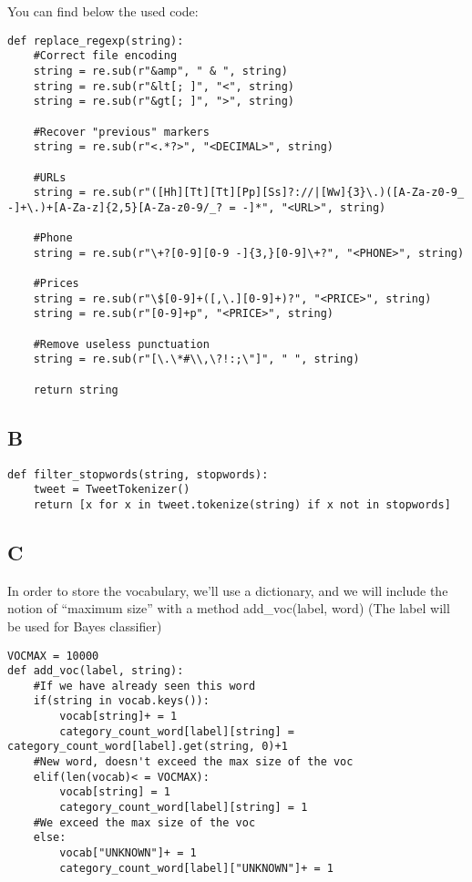 \documentclass{article}
\begin{document}
            You can find below the used code:
            \begin{verbatim}
def replace_regexp(string):
    #Correct file encoding
    string = re.sub(r"&amp", " & ", string)
    string = re.sub(r"&lt[; ]", "<", string)
    string = re.sub(r"&gt[; ]", ">", string)

    #Recover "previous" markers
    string = re.sub(r"<.*?>", "<DECIMAL>", string)

    #URLs
    string = re.sub(r"([Hh][Tt][Tt][Pp][Ss]?://|[Ww]{3}\.)([A-Za-z0-9_ -]+\.)+[A-Za-z]{2,5}[A-Za-z0-9/_? = -]*", "<URL>", string)

    #Phone
    string = re.sub(r"\+?[0-9][0-9 -]{3,}[0-9]\+?", "<PHONE>", string)

    #Prices
    string = re.sub(r"\$[0-9]+([,\.][0-9]+)?", "<PRICE>", string)
    string = re.sub(r"[0-9]+p", "<PRICE>", string)

    #Remove useless punctuation
    string = re.sub(r"[\.\*#\\,\?!:;\"]", " ", string)

    return string
            \end{verbatim}
        \subsection{B}
            \begin{verbatim}
def filter_stopwords(string, stopwords):
    tweet = TweetTokenizer()
    return [x for x in tweet.tokenize(string) if x not in stopwords]
            \end{verbatim}
        \subsection{C}
            In order to store the vocabulary, we'll use a dictionary, and we will include the notion of ``maximum size'' with a method add\_voc(label, word) (The label will be used for Bayes classifier)
            \begin{verbatim}
VOCMAX = 10000
def add_voc(label, string):
    #If we have already seen this word
    if(string in vocab.keys()):
        vocab[string]+ = 1
        category_count_word[label][string] = category_count_word[label].get(string, 0)+1
    #New word, doesn't exceed the max size of the voc
    elif(len(vocab)< = VOCMAX):
        vocab[string] = 1
        category_count_word[label][string] = 1
    #We exceed the max size of the voc
    else:
        vocab["UNKNOWN"]+ = 1
        category_count_word[label]["UNKNOWN"]+ = 1
            \end{verbatim}
\end{document}
